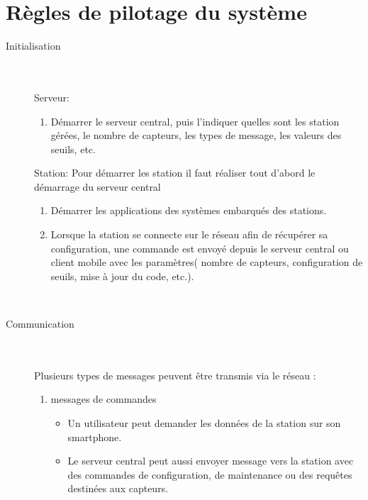 \section{Règles de pilotage du système}

\begin{description}

\item[Initialisation]\hfill\\
	\\Serveur:
	\begin{enumerate}
	\item Démarrer le serveur central, puis l'indiquer quelles sont les station gérées, le nombre de capteurs, les types de message, les valeurs des seuils, etc.\\
	\end{enumerate}
	Station: 
	Pour démarrer les station il faut réaliser tout d'abord le démarrage du serveur central
	\begin{enumerate}
	\item Démarrer les applications des systèmes embarqués des stations.
	\item Lorsque la station se connecte sur le réseau afin de récupérer sa configuration, une commande est envoyé depuis le serveur central ou client mobile avec les paramètres( nombre de capteurs, configuration de seuils, mise à jour du code, etc.).
	\end{enumerate}
\hfill\\
\item [Communication]\hfill\\
	\\Plusieurs types de messages peuvent être transmis via le réseau :\\
	\begin{enumerate}
	\item messages de commandes \\
		\begin{itemize}
		\item Un utilisateur peut demander les données de la station sur son smartphone.\\
		\item Le serveur central peut aussi envoyer message vers la station avec des commandes de configuration, de maintenance ou des requêtes destinées aux capteurs.\\
		\end{itemize}
	

\end{enumerate}
\end{description}
